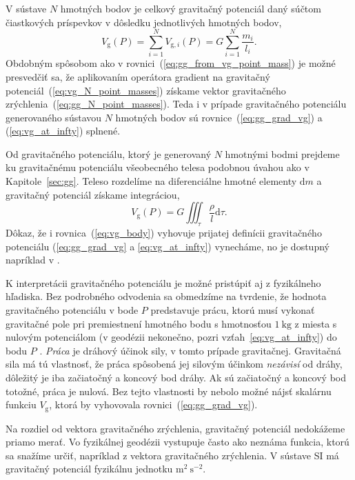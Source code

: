 \documentclass[a4paper, 12pt]{book}
\newcommand{\diff}{\mathrm d}
\newcommand{\gidx}{\mathrm g}
\begin{document}
V sústave $N$ hmotných bodov je celkový gravitačný potenciál daný súčtom 
čiastkových príspevkov v dôsledku jednotlivých hmotných bodov,
%
\begin{equation}
\label{eq:vg_N_point_masses}
V_\gidx(P) = \sum_{i = 1}^{N} V_{\gidx,i}(P) = G \sum_{i = 1}^{N}\frac{
m_i}{l_i}{.}
\end{equation}
%
Obdobným spôsobom ako v rovnici~(\ref{eq:gg_from_vg_point_mass}) je možné 
presvedčiť sa, že aplikovaním operátora gradient na gravitačný 
potenciál~(\ref{eq:vg_N_point_masses}) získame vektor gravitačného 
zrýchlenia~(\ref{eq:gg_N_point_masses}).  Teda i v prípade gravitačného 
potenciálu generovaného sústavou $N$ hmotných bodov sú 
rovnice~(\ref{eq:gg_grad_vg}) a (\ref{eq:vg_at_infty}) splnené.

Od gravitačného potenciálu, ktorý je generovaný $N$ hmotnými bodmi prejdeme ku 
gravitačnému potenciálu všeobecného telesa podobnou úvahou ako 
v Kapitole~\ref{sec:gg}.  Teleso rozdelíme na diferenciálne hmotné elementy 
$\diff m$ a gravitačný potenciál získame integráciou,
%
\begin{equation}
\label{eq:vg_body}
V_\gidx(P) = G \iiint_{\tau} \frac{\rho}{l} \diff\tau{.}
\end{equation}
%
Dôkaz, že i rovnica~(\ref{eq:vg_body}) vyhovuje prijatej definícii gravitačného 
potenciálu (\ref{eq:gg_grad_vg} a \ref{eq:vg_at_infty}) vynecháme, no je 
dostupný napríklad v \cite{MacMillan1930}.

K interpretácii gravitačného potenciálu je možné pristúpiť aj z fyzikálneho 
hľadiska.  Bez podrobného odvodenia sa obmedzíme na tvrdenie, že hodnota 
gravitačného potenciálu v bode $P$ predstavuje prácu, ktorú musí vykonať 
gravitačné pole pri premiestnení hmotného bodu s hmotnosťou $1\ \mathrm{kg}$ 
z miesta s nulovým potenciálom (v geodézii nekonečno, pozri 
vzťah~\ref{eq:vg_at_infty}) do bodu $P$ 
\citep{MacMillan1930,Kellogg1967,TorgeGeodesy}.  \emph{Práca} je dráhový účinok 
sily, v tomto prípade gravitačnej.  Gravitačná sila má tú vlastnosť, že práca 
spôsobená jej silovým účinkom \emph{nezávisí} od dráhy, dôležitý je iba 
začiatočný a koncový bod dráhy.  Ak sú začiatočný a koncový bod totožné, práca 
je nulová.  Bez tejto vlastnosti by nebolo možné nájsť skalárnu funkciu 
$V_\gidx$, ktorá by vyhovovala rovnici~(\ref{eq:gg_grad_vg}).

Na rozdiel od vektora gravitačného zrýchlenia, gravitačný potenciál nedokážeme 
priamo merať.  Vo fyzikálnej geodézii vystupuje často ako neznáma funkcia, 
ktorú sa snažíme určiť, napríklad z vektora gravitačného zrýchlenia.  V sústave 
SI má gravitačný potenciál fyzikálnu jednotku $\mathrm{m}^2\ \mathrm{s}^{-2}$.
\end{document}
